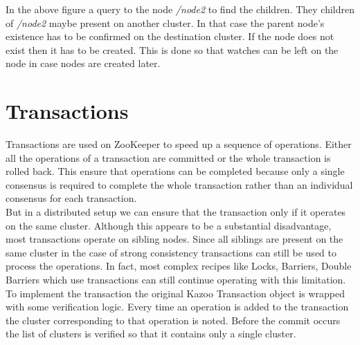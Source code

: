 

In the above figure a query to the node \textit{/node2} to find the children. They children of \textit{/node2} maybe present on another cluster. In that case the parent node's existence has to be confirmed on the destination cluster. If the node does not exist then it has to be created. This is done so that watches can be left on the node in case nodes are created later.

\section{Transactions}
Transactions are used on ZooKeeper to speed up a sequence of operations. Either all the operations of a transaction are committed or the whole transaction is rolled back. This ensure that operations can be completed because only a single consensus is required to complete the whole transaction rather than an individual consensus for each transaction.\\
    But in a distributed setup we can ensure that the transaction only if it operates on the same cluster. Although this appears to be a substantial disadvantage, most transactions operate on sibling nodes. Since all siblings are present on the same cluster in the case of strong consistency transactions can still be used to process the operations. In fact, most complex recipes like Locks, Barriers, Double Barriers which use transactions can still continue operating with this limitation.
    To implement the transaction the original Kazoo Transaction object is wrapped with some verification logic. Every time an operation is added to the transaction the cluster corresponding to that operation is noted. Before the commit occurs the list of clusters is verified so that it contains only a single cluster.
    
